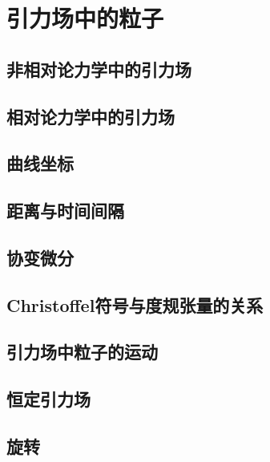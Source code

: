 \chapter{引力场中的粒子}

\section{非相对论力学中的引力场}

\section{相对论力学中的引力场}

\section{曲线坐标}

\section{距离与时间间隔}

\section{协变微分}

\section{Christoffel符号与度规张量的关系}

\section{引力场中粒子的运动}

\section{恒定引力场}

\section{旋转}

